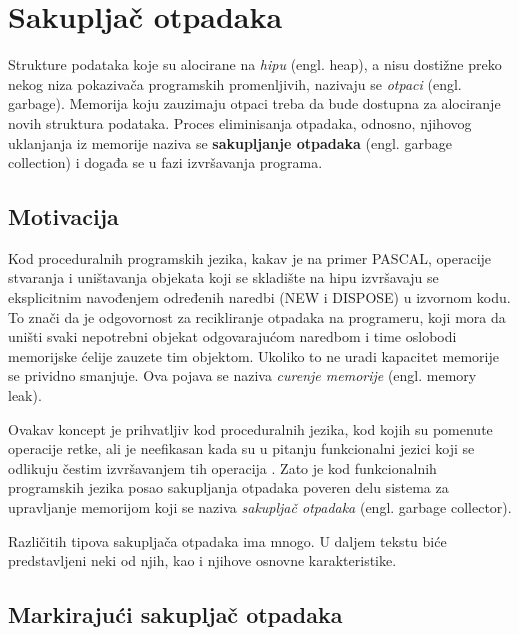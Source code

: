 \section{Sakupljač otpadaka}
\label{sec:djubretar}


Strukture podataka koje su alocirane na \textit{hipu} (engl. heap), a nisu dostižne preko nekog niza pokazivača programskih promenljivih, nazivaju se \textit{otpaci} (engl. garbage). Memorija koju zauzimaju otpaci treba da bude dostupna za alociranje novih struktura podataka. Proces eliminisanja otpadaka, odnosno, njihovog uklanjanja iz memorije naziva se \textbf{sakupljanje otpadaka} (engl. garbage collection) i događa se u fazi izvršavanja programa.

\subsection{Motivacija}

Kod proceduralnih programskih jezika, kakav je na primer PASCAL, operacije stvaranja i uništavanja objekata koji se skladište na hipu izvršavaju se eksplicitnim navođenjem određenih naredbi (NEW i DISPOSE) u izvornom kodu. To znači da je odgovornost za recikliranje otpadaka na programeru, koji mora da uništi svaki nepotrebni objekat odgovarajućom naredbom i time oslobodi memorijske ćelije zauzete tim objektom. Ukoliko to ne uradi kapacitet memorije se prividno smanjuje. Ova pojava se naziva \textit{curenje memorije} (engl. memory leak).

Ovakav koncept je prihvatljiv kod proceduralnih jezika, kod kojih su pomenute operacije retke, ali je neefikasan kada su u pitanju funkcionalni jezici koji se odlikuju čestim izvršavanjem tih operacija \cite{appel}. Zato je kod funkcionalnih programskih jezika posao sakupljanja otpadaka poveren delu sistema za upravljanje memorijom koji se naziva \textit{sakupljač otpadaka} (engl. garbage collector).

Različitih tipova sakupljača otpadaka ima mnogo. U daljem tekstu biće predstavljeni neki od njih, kao i njihove osnovne karakteristike.

\subsection{Markirajući sakupljač otpadaka}

